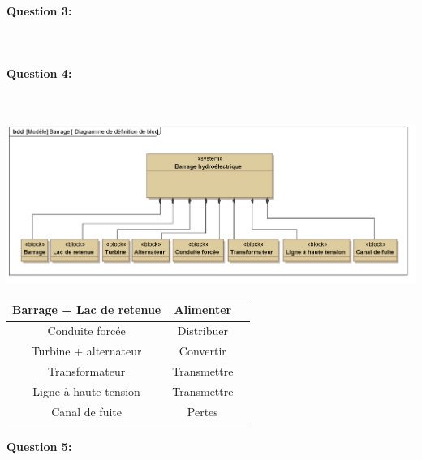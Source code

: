 \begin{minipage}{0.49\linewidth}

\paragraph{Question 3:}

~\

\end{minipage}
\hfill
\begin{minipage}{0.49\linewidth}

\paragraph{Question 4:}

~\
\end{minipage}

\begin{minipage}{0.49\linewidth}
\begin{center}
	\includegraphics[width=0.9\linewidth]{img/Barrage_bloc}
\end{center}
\end{minipage}
\hfill
\begin{minipage}{0.49\linewidth}
\begin{center}
   \begin{tabular}{|c|c|c|}
	\hline
	Barrage + Lac de retenue & Alimenter \\
	\hline
	Conduite forcée & Distribuer \\
	\hline
	Turbine + alternateur & Convertir \\
	\hline
	Transformateur & Transmettre \\
	\hline
	Ligne à haute tension & Transmettre \\
	\hline
	Canal de fuite & Pertes \\
	\hline
   \end{tabular}
\end{center}
\end{minipage}

\paragraph{Question 5:}

